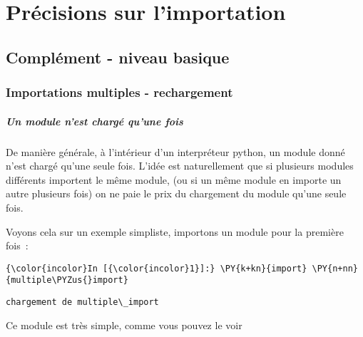     
    
    
    

    

    \hypertarget{pruxe9cisions-sur-limportation}{%
\section{Précisions sur
l'importation}\label{pruxe9cisions-sur-limportation}}

    \hypertarget{compluxe9ment---niveau-basique}{%
\subsection{Complément - niveau
basique}\label{compluxe9ment---niveau-basique}}

    \hypertarget{importations-multiples---rechargement}{%
\subsubsection{Importations multiples -
rechargement}\label{importations-multiples---rechargement}}

    \hypertarget{un-module-nest-charguxe9-quune-fois}{%
\subparagraph{Un module n'est chargé qu'une
fois}\label{un-module-nest-charguxe9-quune-fois}}

    De manière générale, à l'intérieur d'un interpréteur python, un module
donné n'est chargé qu'une seule fois. L'idée est naturellement que si
plusieurs modules différents importent le même module, (ou si un même
module en importe un autre plusieurs fois) on ne paie le prix du
chargement du module qu'une seule fois.

Voyons cela sur un exemple simpliste, importons un module pour la
première fois~:

    \begin{Verbatim}[commandchars=\\\{\},frame=single,framerule=0.3mm,rulecolor=\color{cellframecolor}]
{\color{incolor}In [{\color{incolor}1}]:} \PY{k+kn}{import} \PY{n+nn}{multiple\PYZus{}import}
\end{Verbatim}


    \begin{Verbatim}[commandchars=\\\{\},frame=single,framerule=0.3mm,rulecolor=\color{cellframecolor}]
chargement de multiple\_import
\end{Verbatim}

    Ce module est très simple, comme vous pouvez le voir

